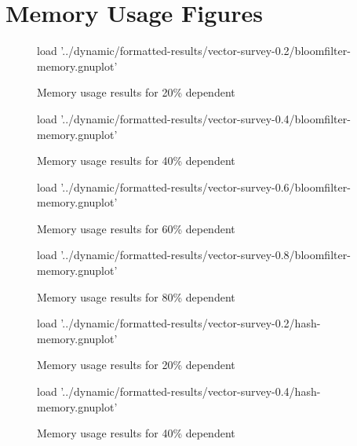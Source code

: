 \chapter{Memory Usage Figures} \label{chp:appndx:memory-figs}
\begin{figure}[H]
	\centering
	\begin{gnuplot}[terminal=pdf]
	load '../dynamic/formatted-results/vector-survey-0.2/bloomfilter-memory.gnuplot'
	\end{gnuplot}
	\caption{Memory usage results for 20\% dependent}
	\label{chart:memory-0.2-bloom}
\end{figure}


\begin{figure}[H]
	\centering
	\begin{gnuplot}[terminal=pdf]
	load '../dynamic/formatted-results/vector-survey-0.4/bloomfilter-memory.gnuplot'
	\end{gnuplot}
	\caption{Memory usage results for 40\% dependent}
	\label{chart:memory-0.4-bloom}
\end{figure}

\begin{figure}[H]
	\centering
	\begin{gnuplot}[terminal=pdf]
	load '../dynamic/formatted-results/vector-survey-0.6/bloomfilter-memory.gnuplot'
	\end{gnuplot}
	\caption{Memory usage results for 60\% dependent}
	\label{chart:memory-0.6-bloom}
\end{figure}

\begin{figure}[H]
	\centering
	\begin{gnuplot}[terminal=pdf]
	load '../dynamic/formatted-results/vector-survey-0.8/bloomfilter-memory.gnuplot'
	\end{gnuplot}
	\caption{Memory usage results for 80\% dependent}
	\label{chart:memory-0.8-bloom}
\end{figure}

\begin{figure}[H]
	\centering
	\begin{gnuplot}[terminal=pdf]
	load '../dynamic/formatted-results/vector-survey-0.2/hash-memory.gnuplot'
	\end{gnuplot}
	\caption{Memory usage results for 20\% dependent}
	\label{chart:memory-0.2-hash}
\end{figure}


\begin{figure}[H]
	\centering
	\begin{gnuplot}[terminal=pdf]
	load '../dynamic/formatted-results/vector-survey-0.4/hash-memory.gnuplot'
	\end{gnuplot}
	\caption{Memory usage results for 40\% dependent}
	\label{chart:memory-0.4-hash}
\end{figure}


